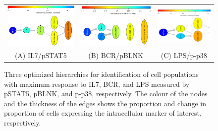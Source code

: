 \begin{landscape}
\begin{figure}[!h]
  \begin{center}
    \begin{tabular}{c||c||c}
      \includegraphics[width=4in,angle=270]{figs/rchy/IL7}&
      \includegraphics[width=4in,angle=270]{figs/rchy/BCR}&
      \includegraphics[width=4in,angle=270]{figs/rchy/LPS}\\
      (A) IL7/pSTAT5 &(B) BCR/pBLNK &(C) LPS/p-p38\\
    \end{tabular}
  \end{center}
  \caption{Three optimized hierarchies for identification of cell populations with maximum response to IL7, BCR, and LPS measured by pSTAT5, pBLNK, and p-p38, respectively.
    The colour of the nodes and the thickness of the edges shows the proportion and change in proportion of cells expressing the intracellular marker of interest, respectively.
  }
  \label{r1:CyTOF}
\end{figure}
\end{landscape}

